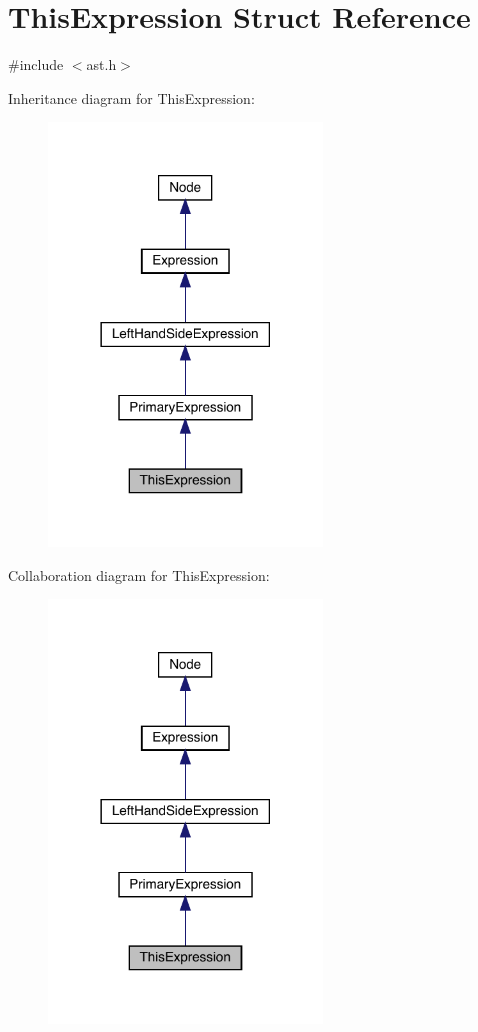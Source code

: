 \hypertarget{struct_this_expression}{}\section{This\+Expression Struct Reference}
\label{struct_this_expression}


{\ttfamily \#include $<$ast.\+h$>$}



Inheritance diagram for This\+Expression\+:\nopagebreak
\begin{figure}[H]
\begin{center}
\leavevmode
\includegraphics[width=206pt]{struct_this_expression__inherit__graph}
\end{center}
\end{figure}


Collaboration diagram for This\+Expression\+:\nopagebreak
\begin{figure}[H]
\begin{center}
\leavevmode
\includegraphics[width=206pt]{struct_this_expression__coll__graph}
\end{center}
\end{figure}
